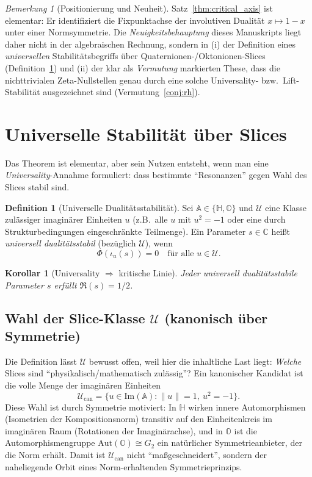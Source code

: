 \documentclass[11pt,a4paper]{article}
\theoremstyle{plain}
\newtheorem{korollar}{Korollar}
\theoremstyle{definition}
\newtheorem{definition}{Definition}
\theoremstyle{remark}
\newtheorem{bemerkung}{Bemerkung}
\newcommand{\C}{\mathbb{C}}
\newcommand{\Hh}{\mathbb{H}}
\newcommand{\Okt}{\mathbb{O}}
\begin{document}
\begin{bemerkung}[Positionierung und Neuheit]
Satz~\ref{thm:critical_axis} ist elementar: Er identifiziert die Fixpunktachse der involutiven Dualität
$x\mapsto 1-x$ unter einer Normsymmetrie.
Die \emph{Neuigkeitsbehauptung} dieses Manuskripts liegt daher nicht in der algebraischen Rechnung,
sondern in (i) der Definition eines \emph{universellen} Stabilitätsbegriffs über Quaternionen-/Oktonionen-Slices
(Definition~\ref{def:universal}) und (ii) der klar als \emph{Vermutung} markierten These,
dass die nichttrivialen Zeta-Nullstellen genau durch eine solche Universality- bzw.\ Lift-Stabilität ausgezeichnet sind
(Vermutung~\ref{conj:rh}).
\end{bemerkung}



\section{Universelle Stabilit\"at \"uber Slices}
Das Theorem ist elementar, aber sein Nutzen entsteht, wenn man eine \emph{Universality}-Annahme
formuliert: dass bestimmte ``Resonanzen'' gegen Wahl des Slices stabil sind.

\begin{definition}[Universelle Dualit\"atsstabilit\"at]\label{def:universal}
Sei $\mathbb{A}\in\{\Hh,\Okt\}$ und $\mathcal{U}$ eine Klasse zul\"assiger imagin\"arer Einheiten
$u$ (z.B.\ alle $u$ mit $u^2=-1$ oder eine durch Strukturbedingungen eingeschr\"ankte Teilmenge).
Ein Parameter $s\in\C$ hei\ss t \emph{universell dualit\"atsstabil} (bez\"uglich $\mathcal{U}$), wenn
\[
\Phi(\iota_u(s))=0\quad\text{f\"ur alle }u\in\mathcal{U}.
\]
\end{definition}

\begin{korollar}[Universality $\Rightarrow$ kritische Linie]
Jeder universell dualit\"atsstabile Parameter $s$ erf\"ullt $\Re(s)=1/2$.
\end{korollar}

\subsection*{Wahl der Slice-Klasse $\mathcal U$ (kanonisch über Symmetrie)}
Die Definition lässt $\mathcal U$ bewusst offen, weil hier die inhaltliche Last liegt:
\emph{Welche} Slices sind ``physikalisch/mathematisch zulässig''?
Ein kanonischer Kandidat ist die volle Menge der imaginären Einheiten
\[
\mathcal U_{\mathrm{can}}=\{u\in\mathrm{Im}(\mathbb A): \|u\|=1,\ u^2=-1\}.
\]
Diese Wahl ist durch Symmetrie motiviert:
In $\Hh$ wirken innere Automorphismen (Isometrien der Kompositionsnorm) transitiv auf den Einheitenkreis
im imaginären Raum (Rotationen der Imaginärachse), und in $\Okt$ ist die Automorphismengruppe
$\mathrm{Aut}(\Okt)\cong G_2$ ein natürlicher Symmetrieanbieter, der die Norm erhält.
Damit ist $\mathcal U_{\mathrm{can}}$ nicht ``maßgeschneidert'', sondern der naheliegende Orbit eines
Norm-erhaltenden Symmetrieprinzips.
\end{document}
